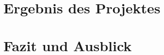 \documentclass[ngerman]{scrartcl} %
\begin{document}
\newpage

\section{Ergebnis des Projektes}        
\label{sec:Ergebnis des Projektes-1}  

\newpage

\section{Fazit und Ausblick}        
\label{sec:Fazit und Ausblick-1}  

\newpage


  


\newpage


\listoffigures
\end{document}
